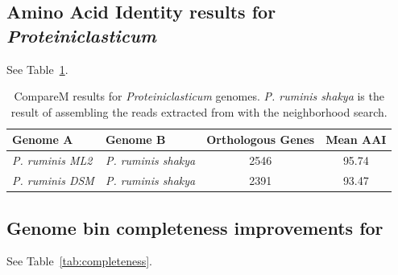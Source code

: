 \subsection{Amino Acid Identity results for {\em Proteiniclasticum}}
\label{subsec:aai}

See Table~\ref{tab:aai}.

\begin{table}
  \begin{tabular}{l l c c }
    \toprule
    Genome A & Genome B & Orthologous Genes & Mean AAI \\
    \midrule
    {\em P. ruminis ML2} & {\em P. ruminis shakya} & 2546 & 95.74 \\
    {\em P. ruminis DSM} & {\em P. ruminis shakya}  & 2391 & 93.47 \\
    \hline
    \bottomrule
  \end{tabular}
  \caption{CompareM results for {\em Proteiniclasticum} genomes. {\em P. ruminis shakya} is the result of assembling the reads extracted from \podarv with the neighborhood search.}
  \label{tab:aai}
\end{table}

\subsection{Genome bin completeness improvements for \hu}
\label{subsec:checkm}

See Table~\ref{tab:completeness}.

